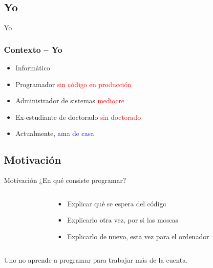 \documentclass[xcolor=x11names,compress]{beamer}
\renewcommand{\(}{\begin{columns}}
\renewcommand{\)}{\end{columns}}
\newcommand{\<}[1]{\begin{column}{#1}}
\renewcommand{\>}{\end{column}}
\begin{document}
\subsection{Yo}
\begin{frame}{Yo}
    \frametitle{Contexto -- Yo}
    \begin{itemize}
        \item Informático \pause
        \item Programador \textcolor{red}{sin código en producción} \pause
        \item Administrador de sistemas \textcolor{red}{mediocre} \pause
        \item Ex-estudiante de doctorado \textcolor{red}{sin doctorado} \pause
        \item Actualmente, \textcolor{blue}{ama de casa}
    \end{itemize}
\end{frame}

\subsection{Motivación}
\begin{frame}{Motivación}
    ¿En qué consiste programar?
    \begin{columns}
        \begin{column}{.5\linewidth}
        \begin{block}
            \codeFactorial
        \end{block}
        \end{column}
        \begin{column}{.5\linewidth}
            \begin{itemize}\itemsep25pt \pause
                \item Explicar qué se espera del código\pause
                \item Explicarlo otra vez, por si las moscas\pause
                \item Explicarlo de nuevo, esta vez para el ordenador\pause
            \end{itemize}
        \end{column}
    \end{columns}
    Uno no aprende a programar para trabajar más de la cuenta.
\end{frame}
\end{document}
